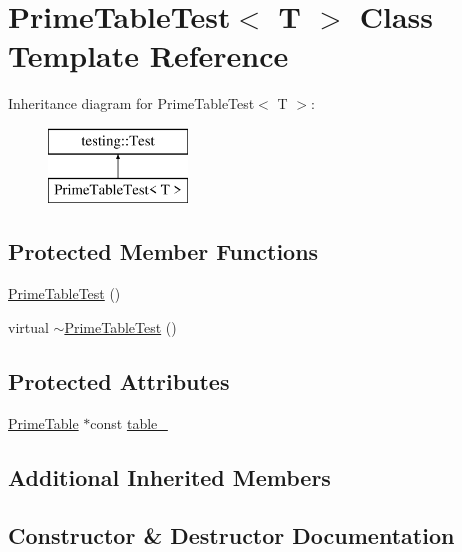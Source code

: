 \hypertarget{class_prime_table_test}{}\section{Prime\+Table\+Test$<$ T $>$ Class Template Reference}
\label{class_prime_table_test}
Inheritance diagram for Prime\+Table\+Test$<$ T $>$\+:\begin{figure}[H]
\begin{center}
\leavevmode
\includegraphics[height=2.000000cm]{class_prime_table_test}
\end{center}
\end{figure}
\subsection*{Protected Member Functions}
\begin{DoxyCompactItemize}
\item 
\hyperlink{class_prime_table_test_ab83d0b24b41bff1ace55f9a8d5ea6dcf}{Prime\+Table\+Test} ()
\item 
virtual \hyperlink{class_prime_table_test_a4fb27ce277675d58ea3f8db99e3bb2b4}{$\sim$\+Prime\+Table\+Test} ()
\end{DoxyCompactItemize}
\subsection*{Protected Attributes}
\begin{DoxyCompactItemize}
\item 
\hyperlink{class_prime_table}{Prime\+Table} $\ast$const \hyperlink{class_prime_table_test_a86da90fc6d5cef6386d0cd8fb52b4046}{table\+\_\+}
\end{DoxyCompactItemize}
\subsection*{Additional Inherited Members}


\subsection{Constructor \& Destructor Documentation}
\hypertarget{class_prime_table_test_ab83d0b24b41bff1ace55f9a8d5ea6dcf}{}
